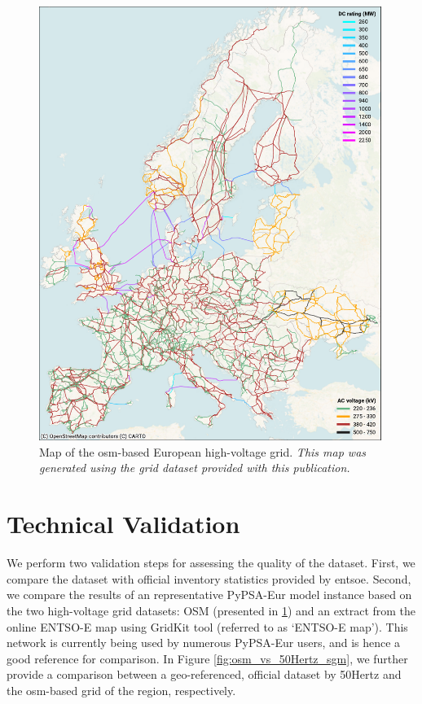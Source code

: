 \documentclass[fleqn,10pt]{wlscirep}
\let\autocite\cite
\begin{document}
\begin{figure}[!htbp]
    \centering
     \includegraphics[width=0.99\textwidth] {figures/fig_osm_map.pdf}
    \caption{Map of the \acrshort{osm}-based European high-voltage grid. \textit{This map was generated using the grid dataset provided with this publication. \autocite{xiongPrebuiltElectricityNetwork2024}}}
    \label{fig:osm_map}
\end{figure}


\newpage
\newpage
\section*{Technical Validation}
\label{sec:technical-validation}
We perform two validation steps for assessing the quality of the dataset. First, we compare the dataset with official inventory statistics provided by \acrshort{entsoe}. Second, we compare the results of an representative PyPSA-Eur model instance based on the two high-voltage grid datasets: OSM (presented in \ref{fig:osm_map}) and an extract from the online ENTSO-E map using GridKit tool (referred to as ‘ENTSO-E map’).\autocite{wiegmansGridKitExtractENTSOE2016} This network is currently being used by numerous PyPSA-Eur users, and is hence a good reference for comparison. In Figure \ref{fig:osm_vs_50Hertz_sgm}, we further provide a comparison between a geo-referenced, official dataset by 50Hertz\autocite{50hertzStaticGridModel2022} and the \acrshort{osm}-based grid of the region, respectively.
\end{document}
